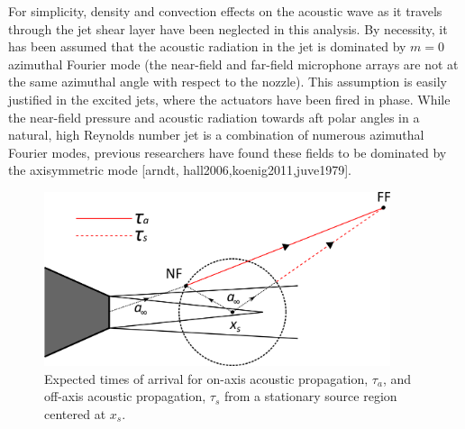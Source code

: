 For simplicity, density and convection effects on the acoustic wave as it travels through the jet shear layer have been neglected in this analysis. 
By necessity, it has been assumed that the acoustic radiation in the jet is dominated by $m = 0$ azimuthal Fourier mode (the near-field and far-field microphone arrays are not at the same azimuthal angle with respect to the nozzle). 
This assumption is easily justified in the excited jets, where the actuators have been fired in phase. 
While the near-field pressure and acoustic radiation towards aft polar angles in a natural, high Reynolds number jet is a combination of numerous azimuthal Fourier modes, previous researchers have found these fields to be dominated by the axisymmetric mode [arndt, hall2006,koenig2011,juve1979].
\begin{figure}
	\centering
	\includegraphics[width=4in]{Figures/ToA_tau.png}
	\caption{Expected times of arrival for on-axis acoustic propagation, $\tau_a$, and off-axis acoustic propagation, $\tau_s$ from a stationary source region centered at $x_s$.}
	\label{fig:ch3_ToA}
\end{figure}

